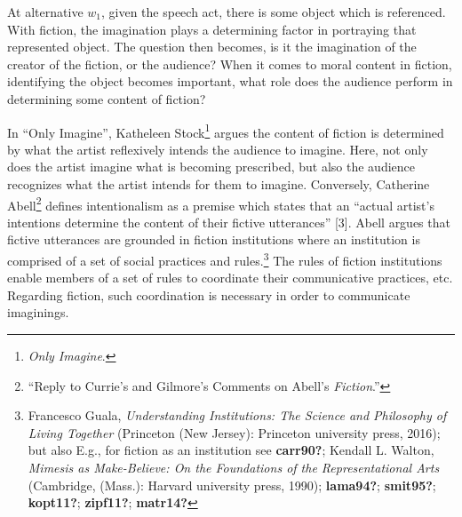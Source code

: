 \documentclass[phdthesis,12pt,final]{wuthesis}
\theoremstyle{definition}
\theoremstyle{definition}
\theoremstyle{definition}
\theoremstyle{definition}
\theoremstyle{remark}
\begin{document}

At alternative \(w_1\), given the speech act, there is some object which is referenced. With fiction, the imagination plays a determining factor in portraying that represented object. The question then becomes, is it the imagination of the creator of the fiction, or the audience? When it comes to moral content in fiction, identifying the object becomes important, what role does the audience perform in determining some content of fiction?

In ``Only Imagine'', Katheleen Stock\footnote{\emph{Only Imagine}.} argues the content of fiction is determined by what the artist reflexively intends the audience to imagine. Here, not only does the artist imagine what is becoming prescribed, but also the audience recognizes what the artist intends for them to imagine. Conversely, Catherine Abell\footnote{{``Reply to {Currie}'s and {Gilmore}'s Comments on {Abell}'s {\emph{Fiction}}.''}} defines intentionalism as a premise which states that an ``actual artist's intentions determine the content of their fictive utterances'' {[}3{]}. Abell argues that fictive utterances are grounded in fiction institutions where an institution is comprised of a set of social practices and rules.\footnote{Francesco Guala, \emph{Understanding Institutions: The Science and Philosophy of Living Together} (Princeton (New Jersey): Princeton university press, 2016); but also E.g., for fiction as an institution see \textbf{carr90?}; Kendall L. Walton, \emph{Mimesis as {Make-Believe}: {On} the {Foundations} of the {Representational Arts}} (Cambridge, (Mass.): Harvard university press, 1990); \textbf{lama94?}; \textbf{smit95?}; \textbf{kopt11?}; \textbf{zipf11?}; \textbf{matr14?}} The rules of fiction institutions enable members of a set of rules to coordinate their communicative practices, etc. Regarding fiction, such coordination is necessary in order to communicate imaginings.
\end{document}
